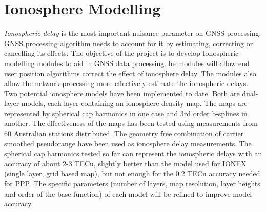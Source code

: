 \chapter{Ionosphere Modelling}
\label{ch:ionosphere_modelling}
%
\textit{Ionospheric delay} is the most important nuisance parameter on GNSS processing. 
GNSS processing algorithm needs to account for it by estimating, correcting or cancelling its effects. 
The objective of the project is to develop Ionospheric modelling modules to aid in GNSS data processing. 
he modules will allow end user position algorithms correct the effect of ionosphere delay. 
The modules also allow the network processing more effectively estimate the ionospheric delays.
\\
%
Two potential ionosphere models have been implemented to date. 
Both are dual-layer models, each layer containing an ionosphere density map. 
The maps are represented by spherical cap harmonics in one case and 3rd order b-splines in another. 
The effectiveness of the maps has been tested using measurements from 60 Australian stations distributed. 
The geometry free combination of carrier smoothed pseudorange have been used as ionosphere delay measurements. 
The spherical cap harmonics tested so far can represent the ionospheric delays with an accuracy of about 2-3 TECu, slightly better than the model used for IONEX (single layer, grid based map), but not enough for the 0.2 TECu accuracy needed for PPP. 
The specific parameters (number of layers, map resolution, layer heights and order of the base function) of each model will be refined to improve model accuracy.
\\
%

